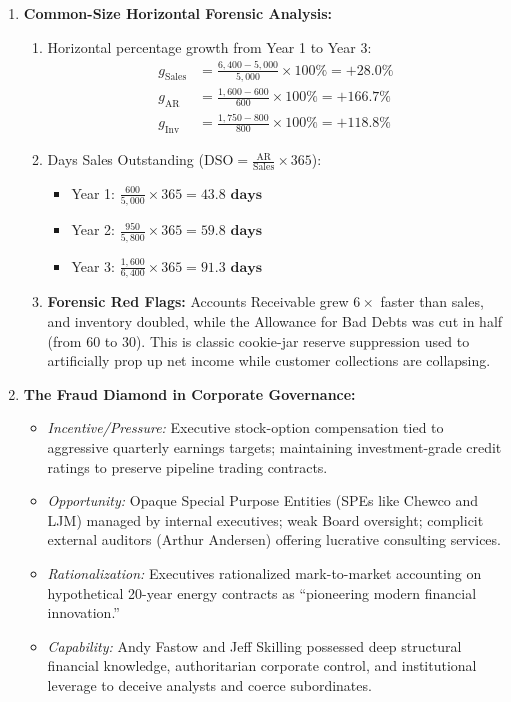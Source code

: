 \begin{enumerate}[label=\textbf{P2.\arabic*}]
    \item \textbf{Common-Size Horizontal Forensic Analysis:}
    \begin{enumerate}[label=(\alph*)]
        \item Horizontal percentage growth from Year 1 to Year 3:
        \begin{align*}
        g_{\text{Sales}} &= \frac{6{,}400 - 5{,}000}{5{,}000} \times 100\% = \mathbf{+28.0\%} \\
        g_{\text{AR}} &= \frac{1{,}600 - 600}{600} \times 100\% = \mathbf{+166.7\%} \\
        g_{\text{Inv}} &= \frac{1{,}750 - 800}{800} \times 100\% = \mathbf{+118.8\%}
        \end{align*}
        \item Days Sales Outstanding ($\text{DSO} = \frac{\text{AR}}{\text{Sales}} \times 365$):
        \begin{itemize}
            \item Year 1: $\frac{600}{5{,}000} \times 365 = \mathbf{43.8\text{ days}}$
            \item Year 2: $\frac{950}{5{,}800} \times 365 = \mathbf{59.8\text{ days}}$
            \item Year 3: $\frac{1{,}600}{6{,}400} \times 365 = \mathbf{91.3\text{ days}}$
        \end{itemize}
        \item \textbf{Forensic Red Flags:} Accounts Receivable grew $6\times$ faster than sales, and inventory doubled, while the Allowance for Bad Debts was cut in half (from $60$ to $30$). This is classic cookie-jar reserve suppression used to artificially prop up net income while customer collections are collapsing.
    \end{enumerate}

    \item \textbf{The Fraud Diamond in Corporate Governance:}
    \begin{itemize}
        \item \textit{Incentive/Pressure:} Executive stock-option compensation tied to aggressive quarterly earnings targets; maintaining investment-grade credit ratings to preserve pipeline trading contracts.
        \item \textit{Opportunity:} Opaque Special Purpose Entities (SPEs like Chewco and LJM) managed by internal executives; weak Board oversight; complicit external auditors (Arthur Andersen) offering lucrative consulting services.
        \item \textit{Rationalization:} Executives rationalized mark-to-market accounting on hypothetical 20-year energy contracts as ``pioneering modern financial innovation.''
        \item \textit{Capability:} Andy Fastow and Jeff Skilling possessed deep structural financial knowledge, authoritarian corporate control, and institutional leverage to deceive analysts and coerce subordinates.
    \end{itemize}


\end{enumerate}
